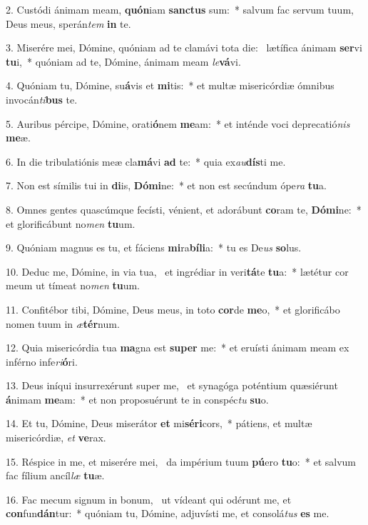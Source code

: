 2. Custódi ánimam meam, \textbf{quón}iam \textbf{sanc}\textbf{tus} sum:~*  salvum fac servum tuum, Deus meus, sperán\textit{tem} \textbf{in} te.\

3. Miserére mei, Dómine, quóniam ad te clamávi tota die: \dag\  lætífica ánimam \textbf{ser}vi \textbf{tu}i,~*  quóniam ad te, Dómine, ánimam meam \textit{le}\textbf{vá}vi.\

4. Quóniam tu, Dómine, su\textbf{á}vis et \textbf{mi}tis:~*  et multæ misericórdiæ ómnibus invocán\textit{ti}\textbf{bus} te.\

5. Auribus pércipe, Dómine, orati\textbf{ó}nem \textbf{me}am:~*  et inténde voci deprecatió\textit{nis} \textbf{me}æ.\

6. In die tribulatiónis meæ cla\textbf{má}vi \textbf{ad} te:~*  quia ex\textit{au}\textbf{dís}ti me.\

7. Non est símilis tui in \textbf{di}is, \textbf{Dó}\textbf{mi}ne:~*  et non est secúndum ópe\textit{ra} \textbf{tu}a.\

8. Omnes gentes quascúmque fecísti, vénient, et adorábunt \textbf{co}ram te, \textbf{Dó}\textbf{mi}ne:~*  et glorificábunt no\textit{men} \textbf{tu}um.\

9. Quóniam magnus es tu, et fáciens \textbf{mi}ra\textbf{bí}\textbf{li}a:~*  tu es De\textit{us} \textbf{so}lus.\

10. Deduc me, Dómine, in via tua, \dag\  et ingrédiar in veri\textbf{tá}te \textbf{tu}a:~*  lætétur cor meum ut tímeat no\textit{men} \textbf{tu}um.\

11. Confitébor tibi, Dómine, Deus meus, in toto \textbf{cor}de \textbf{me}o,~*  et glorificábo nomen tuum in \textit{æ}\textbf{tér}num.\

12. Quia misericórdia tua \textbf{ma}gna est \textbf{su}\textbf{per} me:~*  et eruísti ánimam meam ex inférno infe\textit{ri}\textbf{ó}ri.\

13. Deus iníqui insurrexérunt super me, \dag\  et synagóga poténtium quæsiérunt \textbf{á}nimam \textbf{me}am:~*  et non proposuérunt te in conspéc\textit{tu} \textbf{su}o.\

14. Et tu, Dómine, Deus miserátor \textbf{et} mi\textbf{sé}\textbf{ri}cors,~*  pátiens, et multæ misericórdiæ, \textit{et} \textbf{ve}rax.\

15. Réspice in me, et miserére mei, \dag\  da impérium tuum \textbf{pú}ero \textbf{tu}o:~*  et salvum fac fílium ancíl\textit{læ} \textbf{tu}æ.\

16. Fac mecum signum in bonum, \dag\  ut vídeant qui odérunt me, et \textbf{con}fun\textbf{dán}tur:~*  quóniam tu, Dómine, adjuvísti me, et consolá\textit{tus} \textbf{es} me.\

